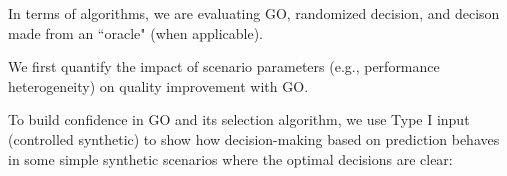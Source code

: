 In terms of algorithms, we are evaluating GO, randomized decision, and decison made from an ``oracle" (when applicable).



We first quantify the impact of scenario parameters (e.g., performance heterogeneity) on quality improvement with GO.

\begin{figure}[h!]
\centering
{}
\label{fig:behavioral}
\end{figure}

To build confidence in GO and its selection algorithm, we use Type I input (controlled synthetic) to show how decision-making based on prediction behaves in some simple synthetic scenarios where the optimal decisions are clear:

